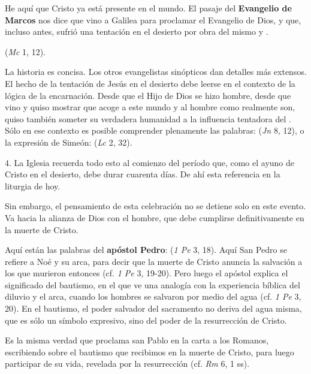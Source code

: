 \begin{body}
He aquí que Cristo ya está presente en el mundo. El pasaje del \textbf{Evangelio de Marcos} nos dice que vino a Galilea para proclamar el Evangelio de Dios, y que, incluso antes, sufrió una tentación en el desierto por obra del mismo  y .

 (\textit{Mc} 1, 12).

La historia es concisa. Los otros evangelistas sinópticos dan detalles más extensos. El hecho de la tentación de Jesús en el desierto debe leerse en el contexto de la lógica de la encarnación. Desde que el Hijo de Dios se hizo hombre, desde que vino  y quiso mostrar que acoge a este mundo y al hombre como realmente son, quiso también someter su verdadera humanidad a la influencia tentadora del . Sólo en ese contexto es posible comprender plenamente las palabras:  (\textit{Jn} 8, 12), o la expresión de Simeón:  (\textit{Lc} 2, 32).

4. La Iglesia recuerda todo esto al comienzo del período que, como el ayuno de Cristo en el desierto, debe durar cuarenta días. De ahí esta referencia en la liturgia de hoy.

Sin embargo, el pensamiento de esta celebración no se detiene solo en este evento. Va hacia la alianza de Dios con el hombre, que debe cumplirse definitivamente en la muerte de Cristo.

Aquí están las palabras del \textbf{apóstol Pedro}:  (\textit{1 Pe} 3, 18). Aquí San Pedro se refiere a Noé y su arca, para decir que la muerte de Cristo anuncia la salvación a los que murieron entonces (cf. \textit{1 Pe} 3, 19-20). Pero luego el apóstol explica el significado del bautismo, en el que ve una analogía con la experiencia bíblica del diluvio y el arca, cuando los hombres se salvaron por medio del agua (cf. \textit{1 Pe} 3, 20). En el bautismo, el poder salvador del sacramento no deriva del agua misma, que es sólo un símbolo expresivo, sino del poder de la resurrección de Cristo.

Es la misma verdad que proclama san Pablo en la carta a los Romanos, escribiendo sobre el bautismo que recibimos en la muerte de Cristo, para luego participar de su vida, revelada por la resurrección (cf. \textit{Rm} 6, 1 ss).


\end{body}
